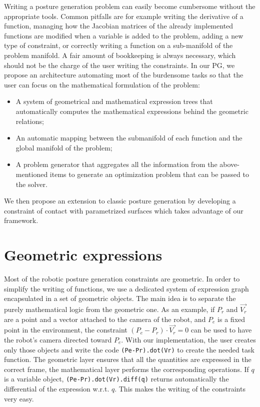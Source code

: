 Writing a posture generation problem can easily become cumbersome without the appropriate tools.
Common pitfalls are for example writing the derivative of a function, managing how the Jacobian matrices of the already implemented functions are modified when a variable is added to the problem, adding a new type of constraint, or correctly writing a function on a sub-manifold of the problem manifold.
A fair amount of bookkeeping is always necessary, which should not be the charge of the user writing the constraints.
In our PG, we propose an architecture automating most of the burdensome tasks so that the user can focus on the mathematical formulation of the problem:
\begin{itemize}
  \item A system of geometrical and mathematical expression trees that automatically computes the mathematical expressions behind the geometric relations;
  \item An automatic mapping between the submanifold of each function and the global manifold of the problem;
  \item A problem generator that aggregates all the information from the above-mentioned items to generate an optimization problem that can be passed to the solver.
\end{itemize}
We then propose an extension to classic posture generation by developing a constraint of contact with parametrized surfaces which takes advantage of our framework.



\section{Geometric expressions}
\label{sec:geometric_expressions}

Most of the robotic posture generation constraints are geometric.
In order to simplify the writing of functions, we use a dedicated system of expression graph encapsulated in a set of geometric objects.
The main idea is to separate the purely mathematical logic from the geometric one.
As an example, if $P_r$ and $\overrightarrow{V_r}$ are a point and a vector attached to the camera of the robot, and $P_e$ is a fixed point in the environment, the constraint $(P_e - P_r)\cdot \overrightarrow{V_r} = 0$ can be used to have the robot's camera directed toward $P_e$.
With our implementation, the user creates only those objects and write the code \texttt{(Pe-Pr).dot(Vr)} to create the needed task function.
The geometric layer ensures that all the quantities are expressed in the correct frame, the mathematical layer performs the corresponding operations.
If $q$ is a variable object, \texttt{(Pe-Pr).dot(Vr).diff(q)} returns automatically the differential of the expression w.r.t. $q$. This makes the writing of the constraints very easy.

